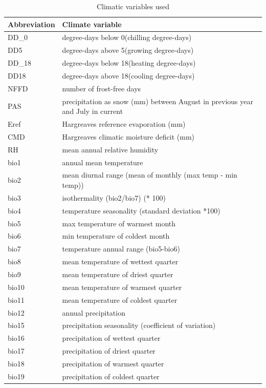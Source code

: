 \documentclass[11pt, oneside]{article}
\begin{document}
\begin{table}[ht]
	\caption[Climate variables]{Climatic variables used }
   \centering
   \begin{tabular}{@{} lp{12cm} @{}}
      \toprule
   Abbreviation & Climate variable \\
      \midrule
	DD\_0	& degree-days below 0\celsius (chilling degree-days)  \\
	DD5	  & degree-days above 5\celsius (growing degree-days)   \\
	DD\_18	& degree-days below 18\celsius (heating degree-days)  \\
	DD18	& degree-days above 18\celsius (cooling degree-days)  \\
	NFFD	& number of frost-free days                           \\
	PAS	  & precipitation as snow (mm) between August in previous year and July in current  \\
	Eref	& Hargreaves reference evaporation (mm) \\
	CMD	  & Hargreaves climatic moisture deficit (mm) \\
	RH    &	mean annual relative humidity \\
  bio1	&	annual mean temperature	\\
	bio2	&	mean diurnal range (mean of monthly (max temp - min temp))	\\
	bio3	&	isothermality (bio2/bio7) (* 100)	\\
	bio4	&	temperature seasonality (standard deviation *100)	\\
	bio5	&	max temperature of warmest month	\\
	bio6	&	min temperature of coldest month	\\
	bio7	&	temperature annual range (bio5-bio6)	\\
	bio8	&	mean temperature of wettest quarter	\\
	bio9	&	mean temperature of driest quarter	\\
	bio10	&	mean temperature of warmest quarter	\\
	bio11	&	mean temperature of coldest quarter	\\
	bio12	&	annual precipitation	\\
	bio15	&	precipitation seasonality (coefficient of variation)	\\
	bio16	&	precipitation of wettest quarter	\\
	bio17	&	precipitation of driest quarter	\\
	bio18	&	precipitation of warmest quarter	\\
	bio19	&	precipitation of coldest quarter	\\
	    \bottomrule
   \end{tabular}
   \label{table:TableS_ClimVars}
\end{table}
\end{document}
